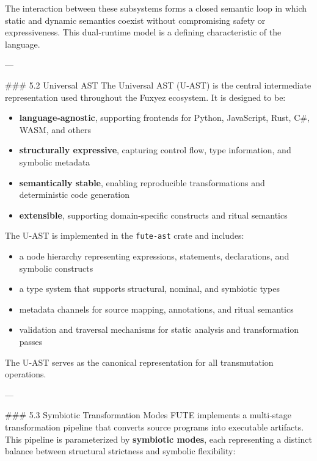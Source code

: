 The interaction between these subsystems forms a closed semantic loop in which static and dynamic semantics coexist without compromising safety or expressiveness. This dual‑runtime model is a defining characteristic of the language.

---

\#\#\# 5.2 Universal AST  
The Universal AST (U‑AST) is the central intermediate representation used throughout the Fuxyez ecosystem. It is designed to be:

\begin{itemize}
  \item \textbf{language‑agnostic}, supporting frontends for Python, JavaScript, Rust, C\#, WASM, and others  
  \item \textbf{structurally expressive}, capturing control flow, type information, and symbolic metadata  
  \item \textbf{semantically stable}, enabling reproducible transformations and deterministic code generation  
  \item \textbf{extensible}, supporting domain‑specific constructs and ritual semantics  
\end{itemize}

The U‑AST is implemented in the \texttt{fute-ast} crate and includes:

\begin{itemize}
  \item a node hierarchy representing expressions, statements, declarations, and symbolic constructs  
  \item a type system that supports structural, nominal, and symbiotic types  
  \item metadata channels for source mapping, annotations, and ritual semantics  
  \item validation and traversal mechanisms for static analysis and transformation passes  
\end{itemize}

The U‑AST serves as the canonical representation for all transmutation operations.

---

\#\#\# 5.3 Symbiotic Transformation Modes  
FUTE implements a multi‑stage transformation pipeline that converts source programs into executable artifacts. This pipeline is parameterized by \textbf{symbiotic modes}, each representing a distinct balance between structural strictness and symbolic flexibility:

